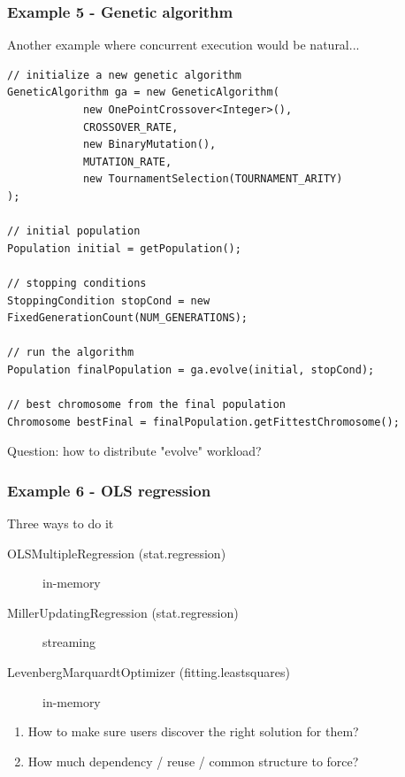 \documentclass[14pt,mathserif]{beamer}
\begin{document}
\begin{frame}[fragile]
  \frametitle{Example 5 - Genetic algorithm}

\begin{small}
Another example where concurrent execution would be natural...
\end{small}
\begin{verbatim}
// initialize a new genetic algorithm
GeneticAlgorithm ga = new GeneticAlgorithm(
            new OnePointCrossover<Integer>(),
            CROSSOVER_RATE, 
            new BinaryMutation(),
            MUTATION_RATE,
            new TournamentSelection(TOURNAMENT_ARITY)
);

// initial population 
Population initial = getPopulation(); 

// stopping conditions
StoppingCondition stopCond = new FixedGenerationCount(NUM_GENERATIONS);

// run the algorithm
Population finalPopulation = ga.evolve(initial, stopCond);

// best chromosome from the final population
Chromosome bestFinal = finalPopulation.getFittestChromosome();

\end{verbatim}
 
\begin{small}
Question: how to distribute "evolve" workload?
\end{small}
\end{frame}

\begin{frame}[fragile]
  \frametitle{Example 6 - OLS regression}

\begin{small}
Three ways to do it
\begin{description}
  \item[OLSMultipleRegression (stat.regression)] in-memory
  \item[MillerUpdatingRegression (stat.regression)] streaming
  \item[LevenbergMarquardtOptimizer (fitting.leastsquares)] in-memory
\end{description}
\begin{enumerate}
\item How to make sure users discover the right solution for them?
\item How much dependency / reuse / common structure to force?
\end{enumerate}
\end{small}
\end{frame}
\end{document}
